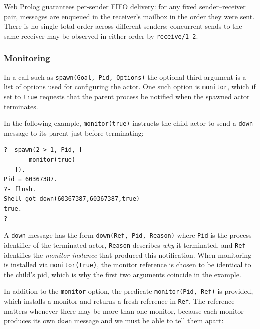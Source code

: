 Web Prolog guarantees per-sender FIFO delivery: for any fixed sender--receiver pair, messages are enqueued in the receiver's mailbox in the order they were sent. There is no single total order across different senders; concurrent sends to the same receiver may be observed in either order by \texttt{receive/1-2}. 

\subsubsection{Monitoring}

In a call such as \texttt{spawn(Goal,\,Pid,\,Options)} the optional third argument is a list of options used for configuring the actor. One such option is \texttt{monitor}, which if set to \texttt{true} requests that the parent process be notified when the spawned actor terminates.

In the following example, \texttt{monitor(true)} instructs the child actor to send a \texttt{down} message to its parent just before terminating:

\begin{verbatim}
?- spawn(2 > 1, Pid, [
       monitor(true)
   ]).
Pid = 60367387.
?- flush.
Shell got down(60367387,60367387,true)
true.
?-
\end{verbatim}

\noindent A \texttt{down} message has the form \texttt{down(Ref,\,Pid,\,Reason)}
where \texttt{Pid} is the process identifier of the terminated actor, \texttt{Reason} describes \emph{why} it terminated, and \texttt{Ref} identifies the \emph{monitor instance} that produced this notification. When monitoring is installed via \texttt{monitor(true)}, the monitor reference is chosen to be identical to the child's pid, which is why the first two arguments coincide in the example.


In addition to the \texttt{monitor} option, the predicate \texttt{monitor(Pid,\,Ref)} is provided, which installs a monitor and returns a fresh reference in \texttt{Ref}. The reference matters whenever there may be more than one monitor, because each monitor produces its own \texttt{down} message and we must be able to tell them apart:

